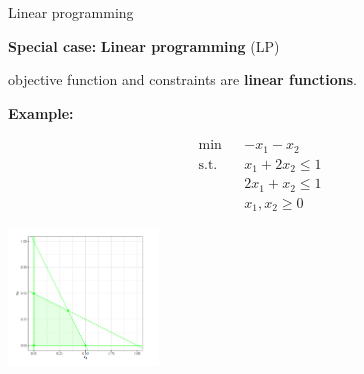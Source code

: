\begin{vbframe}{Linear programming}

\textbf{Special case:} \textbf{Linear programming} (LP)

objective function and constraints are \textbf{linear functions}.

\lz

\textbf{Example:}

\vspace*{-1cm}
\begin{footnotesize}
\begin{eqnarray*}
\min && - x_1 - x_2 \\
\text{s.t. } && x_1 + 2x_2 \le 1\\
&& 2x_1 + x_2 \le 1 \\
&& x_1, x_2 \ge 0
\end{eqnarray*}
\end{footnotesize}

\begin{center}
\includegraphics[width = 0.3\textwidth]{figure_man/linear-pro-example.png}
\end{center}











\end{vbframe}
